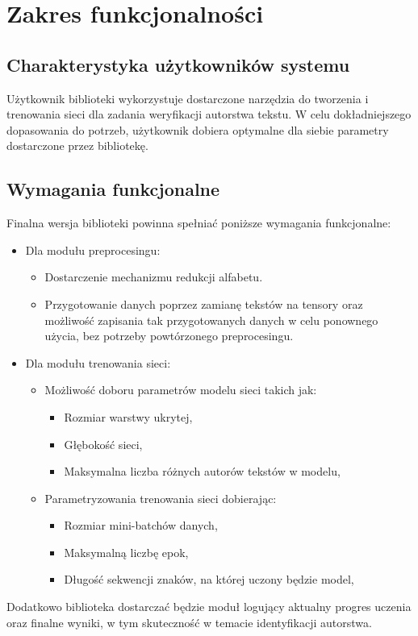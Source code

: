 \newpage
\section{Zakres funkcjonalności}

\subsection{Charakterystyka użytkowników systemu}
Użytkownik biblioteki wykorzystuje dostarczone narzędzia do tworzenia i trenowania sieci 
dla zadania weryfikacji autorstwa tekstu. W celu dokładniejszego dopasowania do potrzeb, 
użytkownik dobiera optymalne dla siebie parametry dostarczone przez bibliotekę.

 
\subsection{Wymagania funkcjonalne}
Finalna wersja biblioteki powinna spełniać poniższe wymagania funkcjonalne:
\begin{itemize}
 	\item Dla modułu preprocesingu:
	    \begin{itemize}
		    \item Dostarczenie mechanizmu redukcji alfabetu.
		    \item Przygotowanie danych poprzez zamianę tekstów na tensory oraz możliwość 
				zapisania tak przygotowanych danych w celu ponownego użycia, bez potrzeby
				powtórzonego preprocesingu. 
	    \end{itemize}
 	\item Dla modułu trenowania sieci:
		\begin{itemize}
			\item Możliwość doboru parametrów modelu sieci takich jak:
				\begin{itemize}
			    	\item Rozmiar warstwy ukrytej,
			    	\item Głębokość sieci,
			    	\item Maksymalna liczba różnych autorów tekstów w modelu,
		    	\end{itemize}
			\item Parametryzowania trenowania sieci dobierając:
				\begin{itemize}
			    	\item Rozmiar mini-batchów danych,
			    	\item Maksymalną liczbę epok,
			    	\item Długość sekwencji znaków, na której uczony będzie model,
		    	\end{itemize}
		  \end{itemize}
\end{itemize}
Dodatkowo biblioteka dostarczać będzie moduł logujący aktualny progres uczenia 
oraz finalne wyniki, w tym skuteczność w temacie identyfikacji autorstwa.	

